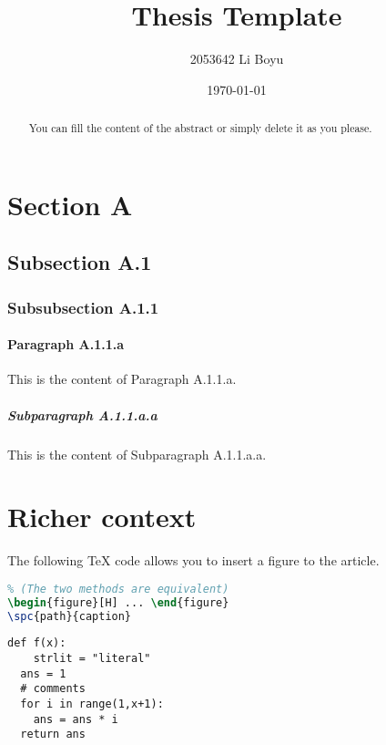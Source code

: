 \documentclass[lang=en,9pt,a4paper,cite=authoryear]{lewisthesis}
\title{Thesis Template}
\author{2053642 Li Boyu}
\institute{Computer Science, CEIE, Tongji Univ.}
\date{\today}
\newcommand{\lil}[1]{\lstinline{#1}}
\newcommand{\spc}[2]{\begin{figure}[H]\centering\texttt{[image: \#1]}\caption{#2}\end{figure}}
\begin{document}
\maketitle

\begin{abstract}
You can fill the content of the abstract or simply delete it as you please.
\end{abstract}

\tableofcontents

\newpage

\section{Section A}

\subsection{Subsection A.1}

\subsubsection{Subsubsection A.1.1}

\paragraph{Paragraph A.1.1.a}

This is the content of Paragraph A.1.1.a.

\subparagraph{Subparagraph A.1.1.a.a}

This is the content of Subparagraph A.1.1.a.a.

\section{Richer context}

The following \TeX{} code allows you to insert a figure to the article.

\begin{lstlisting}[language=TeX]
% Adding a figure to the article:
% (The two methods are equivalent)
\begin{figure}[H] ... \end{figure}
\spc{path}{caption}
\end{lstlisting}

\begin{lstlisting}[style=lstypy,caption={\lil{Python} Source Code}]
def f(x):
	strlit = "literal"
  ans = 1
  # comments
  for i in range(1,x+1):
    ans = ans * i
  return ans
\end{lstlisting}
\end{document}
